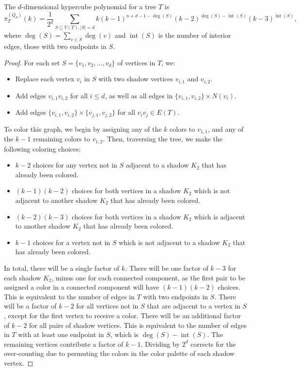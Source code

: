 \documentclass[10pt,a4paper]{amsart}
\newcommand{\Int}{\operatorname{int}}
\begin{document}
\begin{theorem}\label{thm:hypercube-trees}
The $d$-dimensional hypercube polynomial for a tree $T$ is
$$
\pi_T^{(Q_d)}(k) =\frac{1}{2^d} \sum_{S \subseteq V(T), |S| = d} k (k - 1)^{n + d - 1 - \deg(S)} (k - 2)^{\deg(S) - \Int(S)} (k - 3)^{\Int(S)},
$$
where $\deg(S) = \sum_{v \in S} \deg(v)$ and $\Int(S)$ is the number of interior edges, those with two endpoints in $S$.
\end{theorem}

\begin{proof}
For each set $S=\{v_1,v_2,\dots,v_d\}$ of vertices in $T$, we:
\begin{itemize}
    \item Replace each vertex $v_i$ in $S$ with two shadow vertices $v_{i,1}$ and $v_{i,2}$.
    \item Add edges $v_{i,1}v_{i,2}$ for all $i\le d$, as well as all edges in $\{v_{i,1},v_{i,2}\}\times N(v_i)$.
    \item Add edges $\{v_{i,1},v_{i,2}\}\times \{v_{j,1},v_{j,2}\}$ for all $v_iv_j\in E(T)$.
\end{itemize}

To color this graph, we begin by assigning any of the $k$ colors to $v_{1,1}$, and any of the $k-1$ remaining colors to $v_{1,2}$. Then, traversing the tree, we make the following coloring choices:
\begin{itemize}
    \item $k-2$ choices for any vertex not in $S$ adjacent to a shadow $K_2$ that has already been colored.
    \item $(k-1)(k-2)$ choices for both vertices in a shadow $K_2$ which is not adjacent to another shadow $K_2$ that has already been colored.
    \item $(k-2)(k-3)$ choices for both vertices in a shadow $K_2$ which is adjacent to another shadow $K_2$ that has already been colored.
    \item $k-1$ choices for a vertex not in $S$ which is not adjacent to a shadow $K_2$ that has already been colored.
\end{itemize}
In total, there will be a single factor of $k$. There will be one factor of $k-3$ for each shadow $K_2$, minus one for each connected component, as the first pair to be assigned a color in a connected component will have $(k-1)(k-2)$ choices. This is equivalent to the number of edges in $T$ with two endpoints in $S$. There will be a factor of $k-2$ for all vertices not in $S$ that are adjacent to a vertex in $S$, except for the first vertex to receive a color. There will be an additional factor of $k-2$ for all pairs of shadow vertices. This is equivalent to the number of edges in $T$ with at least one endpoint in $S$, which is $\deg(S)-\Int(S)$. The remaining vertices contribute a factor of $k-1$. Dividing by $2^d$ corrects for the over-counting due to permuting the colors in the color palette of each shadow vertex.
\end{proof}
\end{document}
